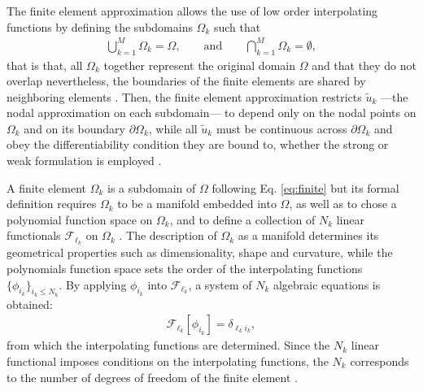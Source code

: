 


The finite element approximation allows the use of low order interpolating functions by defining the subdomains $\Omega_k$ such that
%
\begin{align}
    \bigcup_{k=1}^M \Omega_k = \Omega,
        \qquad
        \text{and}
        \qquad
    \bigcap_{k=1}^M \Omega_k = \emptyset,
\label{eq:finite}
\end{align}
%
that is that, all $\Omega_k$ together represent the original domain $\Omega$ and that they do not overlap nevertheless, the boundaries of the finite elements are shared by neighboring elements \cite{dhatt_finite_2012}. Then, the finite element approximation restricts  $\tilde{u}_k$  ---the nodal approximation  on each subdomain--- to depend only on the nodal points on $\Omega_k$ and on its boundary $\partial\Omega_k$, while all $\tilde{u}_k$ must be continuous across $\partial \Omega_k$ and obey the  differentiability condition they are bound to, whether the strong or weak formulation is employed \cite{dhatt_finite_2012}.

A finite element $\Omega_k$ is a subdomain of $\Omega$ following Eq. \eqref{eq:finite} \cite{dhatt_finite_2012}  but its formal definition requires $\Omega_k$ to be a manifold embedded into $\Omega$, as well as to chose a polynomial function space on $\Omega_k$, and to define a collection of $N_k$ linear functionals $\mathcal{F}_{\ell_k}$ on $\Omega_k$ \cite{larson_finite_2013}. The description of $\Omega_k$ as a manifold determines its geometrical properties such as dimensionality, shape and curvature, while the polynomials function space sets the order of the interpolating functions $\{\phi_{i_k}\}_{i_k\leq N_k}$. By applying $\phi_{i_k}$ into  $\mathcal{F}_{\ell_k}$, a system of $N_k$ algebraic  equations is obtained:
%
\begin{align}
    \mathcal{F}_{\ell_k}[\phi_{i_k}] = \delta_{{\ell_k} {i_k}},
    \label{eq:linfunc}
\end{align}
%
from which the interpolating functions are determined. Since the $N_k$ linear functional imposes conditions on the interpolating functions, the $N_k$ corresponds to the number of degrees of freedom of the finite element \cite{larson_finite_2013}.

